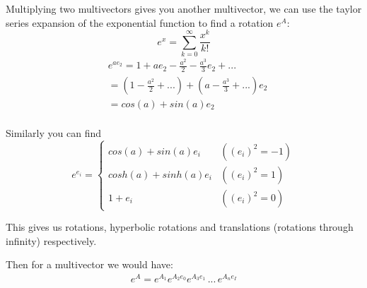 \documentclass[twoside]{article}
\newcommand{\B}[1]{\left(#1\right)} %
\newcommand{\F}[2]{\frac{#1}{#2}} %
\begin{document}
\begin{multicols*}{2}
            \par
                Multiplying two multivectors gives you another multivector,
                we can use the taylor series expansion of the exponential function
                to find a rotation $e^A$:
                $$ e^x = \sum_{k=0}^\infty \F{x^k}{k!} $$
                $$\begin{aligned}
                    &e^{a e_2} = 1 + a e_2 - \F{a^2}{2} - \F{a^3}{3} e_2 + ... \\
                    &= (1 - \F{a^2}{2} + ...) + (a - \F{a^3}{3} + ...) e_2 \\
                    &= cos(a) + sin(a) e_2 \\
                \end{aligned}$$
            \par
                Similarly you can find
                $$ e^{e_i} = \begin{cases}
                    cos(a) + sin(a) e_i & (\B{e_i}^2 = -1) \\
                    cosh(a) + sinh(a) e_i & (\B{e_i}^2 = 1) \\
                    1 + e_i & (\B{e_i}^2 = 0)
                    \end{cases}$$
            \par
                This gives us rotations, hyperbolic rotations and translations (rotations through infinity) respectively.
            \par
                Then for a multivector we would have:
                \begin{gather*}
                    e^A = e^{A_1} e^{A_2 e_0} e^{A_3 e_1} \, ... \, e^{A_n e_I} \\
                \end{gather*}

\end{multicols*}
\end{document}
